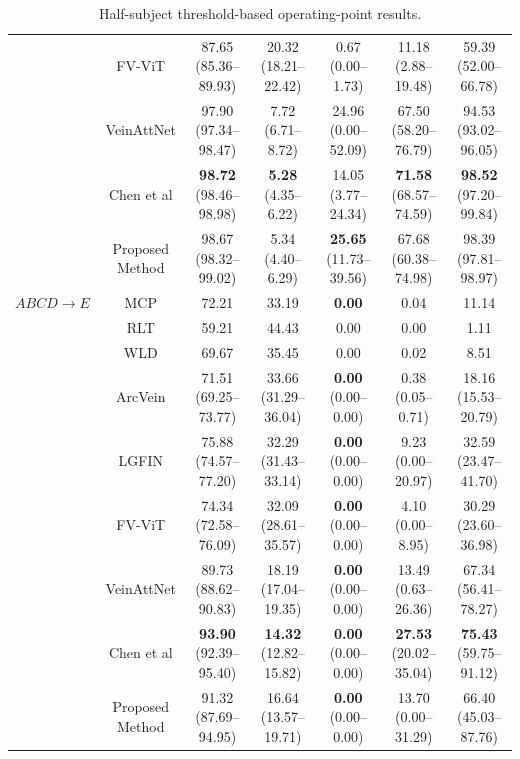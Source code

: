 \documentclass[11pt]{article}
\begin{document}
\begin{table}[ht!]
{\begin{tabular}{|c|c|c|c|c|c|c|}
         & FV-ViT & 87.65 (85.36--89.93) & 20.32 (18.21--22.42) & 0.67 (0.00--1.73) & 11.18 (2.88--19.48) & 59.39 (52.00--66.78) \\
         & VeinAttNet & 97.90 (97.34--98.47) & 7.72 (6.71--8.72) & 24.96 (0.00--52.09) & 67.50 (58.20--76.79) & 94.53 (93.02--96.05) \\
         & Chen et al & \textbf{98.72} (98.46--98.98) & \textbf{5.28} (4.35--6.22) & 14.05 (3.77--24.34) & \textbf{71.58} (68.57--74.59) & \textbf{98.52} (97.20--99.84) \\
         & Proposed Method & 98.67 (98.32--99.02) & 5.34 (4.40--6.29) & \textbf{25.65} (11.73--39.56) & 67.68 (60.38--74.98) & 98.39 (97.81--98.97) \\
        \hline
        $ABCD \rightarrow E$ & MCP & 72.21 & 33.19 & \textbf{0.00} & 0.04 & 11.14 \\
         & RLT & 59.21 & 44.43 & 0.00 & 0.00 & 1.11 \\
         & WLD & 69.67 & 35.45 & 0.00 & 0.02 & 8.51 \\
         & ArcVein & 71.51 (69.25--73.77) & 33.66 (31.29--36.04) & \textbf{0.00} (0.00--0.00) & 0.38 (0.05--0.71) & 18.16 (15.53--20.79) \\
         & LGFIN & 75.88 (74.57--77.20) & 32.29 (31.43--33.14) & \textbf{0.00} (0.00--0.00) & 9.23 (0.00--20.97) & 32.59 (23.47--41.70) \\
         & FV-ViT & 74.34 (72.58--76.09) & 32.09 (28.61--35.57) & \textbf{0.00} (0.00--0.00) & 4.10 (0.00--8.95) & 30.29 (23.60--36.98) \\
         & VeinAttNet & 89.73 (88.62--90.83) & 18.19 (17.04--19.35) & \textbf{0.00} (0.00--0.00) & 13.49 (0.63--26.36) & 67.34 (56.41--78.27) \\
         & Chen et al & \textbf{93.90} (92.39--95.40) & \textbf{14.32} (12.82--15.82) & \textbf{0.00} (0.00--0.00) & \textbf{27.53} (20.02--35.04) & \textbf{75.43} (59.75--91.12) \\
         & Proposed Method & 91.32 (87.69--94.95) & 16.64 (13.57--19.71) & \textbf{0.00} (0.00--0.00) & 13.70 (0.00--31.29) & 66.40 (45.03--87.76) \\
        \hline
    \end{tabular}}
    \caption{Half-subject threshold-based operating-point results.}
    \label{tab:rebuttal_half_thresholds}
\end{table}
\end{document}
